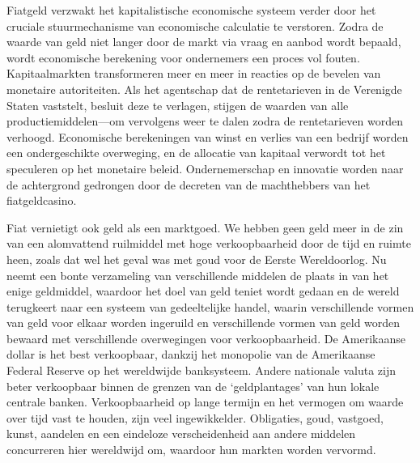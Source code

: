 Fiatgeld verzwakt het kapitalistische economische systeem verder door het cruciale stuurmechanisme van economische calculatie te verstoren. Zodra de waarde van geld niet langer door de markt via vraag en aanbod wordt bepaald, wordt economische berekening voor ondernemers een proces vol fouten. Kapitaalmarkten transformeren meer en meer in reacties op de bevelen van monetaire autoriteiten. Als het agentschap dat de rentetarieven in de Verenigde Staten vaststelt, besluit deze te verlagen, stijgen de waarden van alle productiemiddelen—om vervolgens weer te dalen zodra de rentetarieven worden verhoogd. Economische berekeningen van winst en verlies van een bedrijf worden een ondergeschikte overweging, en de allocatie van kapitaal verwordt tot het speculeren op het monetaire beleid. Ondernemerschap en innovatie worden naar de achtergrond gedrongen door de decreten van de machthebbers van het fiatgeldcasino.

Fiat vernietigt ook geld als een marktgoed. We hebben geen geld meer in de zin van een alomvattend ruilmiddel met hoge verkoopbaarheid door de tijd en ruimte heen, zoals dat wel het geval was met goud voor de Eerste Wereldoorlog. Nu neemt een bonte verzameling van verschillende middelen de plaats in van het enige geldmiddel, waardoor het doel van geld teniet wordt gedaan en de wereld terugkeert naar een systeem van gedeeltelijke handel, waarin verschillende vormen van geld voor elkaar worden ingeruild en verschillende vormen van geld worden bewaard met verschillende overwegingen voor verkoopbaarheid. De Amerikaanse dollar is het best verkoopbaar, dankzij het monopolie van de Amerikaanse Federal Reserve op het wereldwijde banksysteem. Andere nationale valuta zijn beter verkoopbaar binnen de grenzen van de `geldplantages' van hun lokale centrale banken. Verkoopbaarheid op lange termijn en het vermogen om waarde over tijd vast te houden, zijn veel ingewikkelder. Obligaties, goud, vastgoed, kunst, aandelen en een eindeloze verscheidenheid aan andere middelen concurreren hier wereldwijd om, waardoor hun markten worden vervormd.

